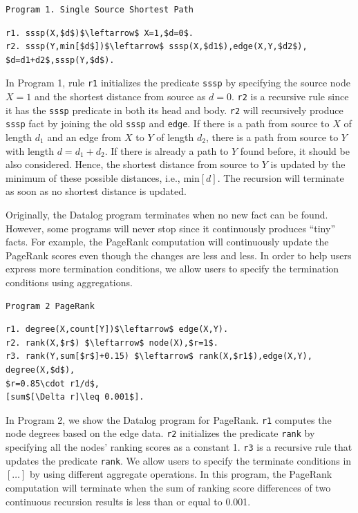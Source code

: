 \documentclass{vldb}
\begin{document}
\begin{verbatim}
Program 1. Single Source Shortest Path
\end{verbatim}
\vspace{-0.1in}
\small
\begin{lstlisting}
r1. sssp(X,$d$)$\leftarrow$ X=1,$d=0$.
r2. sssp(Y,min[$d$])$\leftarrow$ sssp(X,$d1$),edge(X,Y,$d2$),
$d=d1+d2$,sssp(Y,$d$).
\end{lstlisting}
\normalsize

In Program 1, rule \texttt{r1} initializes the predicate \texttt{sssp} by specifying the source node $X=1$ and the shortest distance from source as $d=0$. \texttt{r2} is a recursive rule since it has the \texttt{sssp} predicate in both its head and body. \texttt{r2} will recursively produce \texttt{sssp} fact by joining the old \texttt{sssp} and \texttt{edge}. If there is a path from source to $X$ of length $d_1$ and an edge from $X$ to $Y$ of length $d_2$, there is a path from source to $Y$ with length $d=d_1+d_2$. If there is already a path to $Y$ found before, it should be also considered. Hence, the shortest distance from source to $Y$ is updated by the minimum of these possible distances, i.e., min$[d]$. The recursion will terminate as soon as no shortest distance is updated.

Originally, the Datalog program terminates when no new fact can be found. However, some programs will never stop since it continuously produces ``tiny'' facts. For example, the PageRank computation will continuously update the PageRank scores even though the changes are less and less. In order to help users express more termination conditions, we allow users to specify the termination conditions using aggregations.


\begin{verbatim}
Program 2 PageRank
\end{verbatim}
\vspace{-0.1in}
\small
\begin{lstlisting}
r1. degree(X,count[Y])$\leftarrow$ edge(X,Y).
r2. rank(X,$r$) $\leftarrow$ node(X),$r=1$.
r3. rank(Y,sum[$r$]+0.15) $\leftarrow$ rank(X,$r1$),edge(X,Y),
degree(X,$d$),
$r=0.85\cdot r1/d$,
[sum$[\Delta r]\leq 0.001$].
\end{lstlisting}
\normalsize

In Program 2, we show the Datalog program for PageRank. \texttt{r1} computes the node degrees based on the edge data. \texttt{r2} initializes the predicate \texttt{rank} by specifying all the nodes' ranking scores as a constant 1. \texttt{r3} is a recursive rule that updates the predicate \texttt{rank}. We allow users to specify the terminate conditions in $[\ldots]$ by using different aggregate operations. In this program, the PageRank computation will terminate when the sum of ranking score differences of two continuous recursion results is less than or equal to 0.001.
\end{document}
